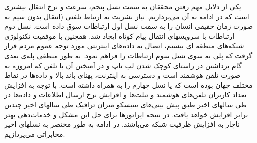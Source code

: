  یکی از دلایل مهم رفتن محققان به سمت نسل پنجم، سرعت و نرخ انتقال بیشتری است که در ادامه به آن می‌پردازیم.
نیاز بشریت به ارتباط تلفنی (انتقال بدون سیم به صورت زمان حقیقی  انسان را به سمت نسل اول ارتباطات  سوق داده است. نسل دوم ارتباطات  با سرویسهای انتقال پیام کوتاه ایجاد شد. همچنین با موفقیت تکنولوژی شبکه‌های منطقه ای بیسیم، اتصال به داده‌های اینترنتی مورد توجه عموم مردم قرار گرفت که پلی به سوی نسل سوم ارتباطات  را فراهم نمود. به طور منطقی پله‌ی‌ بعدی گام برداشتن در راستای کوچک شدن لپ تاپ و در آمیختن آن با تلفن که امروزه به صورت تلفن هوشمند است و دسترسی به اینترنت، پهنای باند بالا و داده‌ها در نقاط مختلف جهان بوده است که  یا نسل چهارم را به همراه داشته است.
با توجه به افزایش تعداد کاربران تلفن‌های
هوشمند و تبلت‌ها و افزایش نرخ ارسال اطلاعات و داده‌ها در طی سالهای اخیر طبق پیش بینی‌های سیسکو میزان ترافیک  طی سالهای اخیر
  چندین برابر افزایش خواهد یافت.
در نتیجه اپراتورها برای حل این مشکل و خدمات‌دهی بهتر ناچار به افزایش ظرفیت شبکه می‌باشند.
در ادامه به طور مختصر به نسلهای اخیر مخابراتی می‌پردازیم\cite{Gen}.
